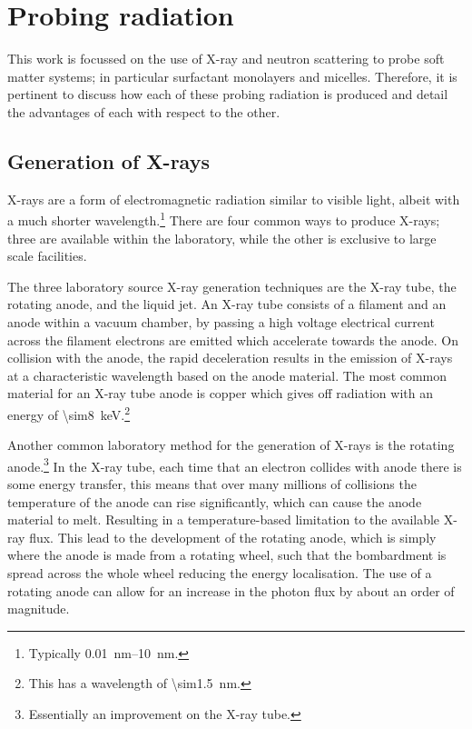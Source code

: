 \section{Probing radiation}
This work is focussed on the use of X-ray and neutron scattering to probe soft matter systems; in particular surfactant monolayers and micelles. Therefore, it is pertinent to discuss how each of these probing radiation is produced and detail the advantages of each with respect to the other.

\subsection{Generation of X-rays}
X-rays are a form of electromagnetic radiation similar to visible light, albeit with a much shorter wavelength.\footnote{Typically \SIrange{0.01}{10}{\nano\meter}.}
There are four common ways to produce X-rays; three are available within the laboratory, while the other is exclusive to large scale facilities.

The three laboratory source X-ray generation techniques are the X-ray tube, the rotating anode, and the liquid jet.
An X-ray tube consists of a filament and an anode within a vacuum chamber, by passing a high voltage electrical current across the filament electrons are emitted which accelerate towards the anode.
On collision with the anode, the rapid deceleration results in the emission of X-rays at a characteristic wavelength based on the anode material.
The most common material for an X-ray tube anode is copper which gives off radiation with an energy of \SI{\sim8}{\kilo\eV}.\footnote{This has a wavelength of \SI{\sim1.5}{\nano\meter}.}

Another common laboratory method for the generation of X-rays is the rotating anode.\footnote{Essentially an improvement on the X-ray tube.}
In the X-ray tube, each time that an electron collides with anode there is some energy transfer, this means that over many millions of collisions the temperature of the anode can rise significantly, which can cause the anode material to melt.
Resulting in a temperature-based limitation to the available X-ray flux.
This lead to the development of the rotating anode, which is simply where the anode is made from a rotating wheel, such that the bombardment is spread across the whole wheel reducing the energy localisation.
The use of a rotating anode can allow for an increase in the photon flux by about an order of magnitude.


